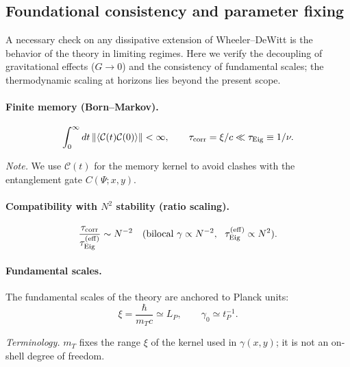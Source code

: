 \documentclass[12pt,a4paper]{article}
\numberwithin{equation}{section}
\begin{document}
\subsection{Foundational consistency and parameter fixing}

\vspace{0.3cm}
A necessary check on any dissipative extension of Wheeler--DeWitt is the behavior of the theory in limiting regimes. Here we verify the decoupling of gravitational effects ($G\to 0$) and the consistency of fundamental scales; the thermodynamic scaling at horizons lies beyond the present scope.

\paragraph{Finite memory (Born--Markov).}
\begin{equation}
\int_0^\infty dt\,\|\langle \mathcal{C}(t)\mathcal{C}(0)\rangle\| < \infty,
\qquad 
\tau_{\mathrm{corr}}=\xi/c \ll \tau_{\rm Eig}\equiv 1/\nu. 
\label{eq:finite-memory}
\end{equation}

\noindent\emph{Note.} We use $\mathcal{C}(t)$ for the memory kernel to avoid
clashes with the entanglement gate $C(\Psi;x,y)$.

\paragraph{Compatibility with $N^2$ stability (ratio scaling).}
\begin{equation}
\frac{\tau_{\mathrm{corr}}}{\tau_{\rm Eig}^{(\mathrm{eff})}} \sim N^{-2}
\quad\text{(bilocal }\gamma\propto N^{-2},\ \
\tau_{\rm Eig}^{(\mathrm{eff})}\propto N^2\text{).} 
\label{eq:ratio-scaling}
\end{equation}

\paragraph{Fundamental scales.}
The fundamental scales of the theory are anchored to Planck units:
\begin{equation}
\xi = \frac{\hbar}{m_T c} \simeq L_P, \qquad
\gamma_0 \simeq t_P^{-1}.
\label{eq:fundamental-scales}
\end{equation}

\noindent\textit{Terminology.} $m_T$ fixes the range $\xi$ of the kernel used
in $\gamma(x,y)$; it is not an on-shell degree of freedom.
\end{document}
